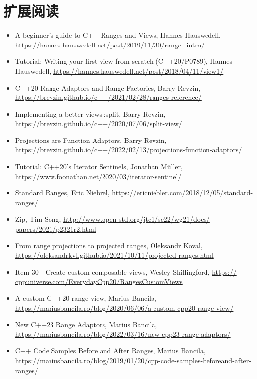 \section{扩展阅读}
\begin{itemize}
  \item A beginner’s guide to C++ Ranges and Views, Hannes Hauswedell, \url{https://hannes.hauswedell.net/post/2019/11/30/range_intro/}
  \item Tutorial: Writing your first view from scratch (C++20/P0789), Hannes Hauswedell, \url{https://hannes.hauswedell.net/post/2018/04/11/view1/}
  \item C++20 Range Adaptors and Range Factories, Barry Revzin, \url{https://brevzin.github.io/c++/2021/02/28/ranges-reference/}
  \item Implementing a better views::split, Barry Revzin, \url{https://brevzin.github.io/c++/2020/07/06/split-view/}
  \item Projections are Function Adaptors, Barry Revzin, \url{https://brevzin.github.io/c++/2022/02/13/projections-function-adaptors/}
  \item Tutorial: C++20’s Iterator Sentinels, Jonathan Müller, \url{https://www.foonathan.net/2020/03/iterator-sentinel/}
  \item Standard Ranges, Eric Niebrel, \url{https://ericniebler.com/2018/12/05/standard-ranges/}
  \item Zip, Tim Song, \url{http://www.open-std.org/jtc1/sc22/wg21/docs/ papers/2021/p2321r2.html}
  \item From range projections to projected ranges, Oleksandr Koval, \url{https://oleksandrkvl.github.io/2021/10/11/projected-ranges.html}
  \item Item 30 - Create custom composable views, Wesley Shillingford, \url{https:// cppuniverse.com/EverydayCpp20/RangesCustomViews}
  \item A custom C++20 range view, Marius Bancila, \url{https://mariusbancila.ro/blog/2020/06/06/a-custom-cpp20-range-view/}
  \item New C++23 Range Adaptors, Marius Bancila, \url{https://mariusbancila.ro/blog/2022/03/16/new-cpp23-range-adaptors/}
  \item C++ Code Samples Before and After Ranges, Marius Bancila, \url{https://mariusbancila.ro/blog/2019/01/20/cpp-code-samples-beforeand-after-ranges/}
\end{itemize}